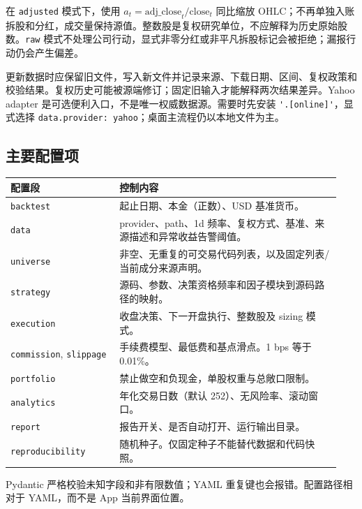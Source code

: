 \documentclass[UTF8,fontset=none,11pt]{ctexart}
\newcommand{\code}[1]{\nolinkurl{#1}}
\let\originalsubsection\subsection
\renewcommand{\subsection}{\Needspace{8\baselineskip}\originalsubsection}
\begin{document}
在 \code{adjusted} 模式下，使用 \(a_t=\text{adj\_close}_t/\text{close}_t\) 同比缩放 OHLC；不再单独入账拆股和分红，成交量保持源值。整数股是复权研究单位，不应解释为历史原始股数。\code{raw} 模式不处理公司行动，显式非零分红或非平凡拆股标记会被拒绝；漏报行动仍会产生偏差。

更新数据时应保留旧文件，写入新文件并记录来源、下载日期、区间、复权政策和校验结果。复权历史可能被源端修订；固定旧输入才能解释两次结果差异。Yahoo adapter 是可选便利入口，不是唯一权威数据源。需要时先安装 \code{'.[online]'}，显式选择 \code{data.provider: yahoo}；桌面主流程仍以本地文件为主。

\subsection{主要配置项}
\begin{longtable}{p{0.31\linewidth}p{0.63\linewidth}}
\toprule 配置段 & 控制内容\\\midrule\endhead
\code{backtest} & 起止日期、本金（正数）、USD 基准货币。\\
\code{data} & provider、path、1d 频率、复权方式、基准、来源描述和异常收益告警阈值。\\
\code{universe} & 非空、无重复的可交易代码列表，以及固定列表/当前成分来源声明。\\
\code{strategy} & 源码、参数、决策资格频率和因子模块到源码路径的映射。\\
\code{execution} & 收盘决策、下一开盘执行、整数股及 sizing 模式。\\
\code{commission}, \code{slippage} & 手续费模型、最低费和基点滑点。1 bps 等于 0.01\%。\\
\code{portfolio} & 禁止做空和负现金，单股权重与总敞口限制。\\
\code{analytics} & 年化交易日数（默认 252）、无风险率、滚动窗口。\\
\code{report} & 报告开关、是否自动打开、运行输出目录。\\
\code{reproducibility} & 随机种子。仅固定种子不能替代数据和代码快照。\\
\bottomrule
\end{longtable}
Pydantic 严格校验未知字段和非有限数值；YAML 重复键也会报错。配置路径相对于 YAML，而不是 App 当前界面位置。
\end{document}
